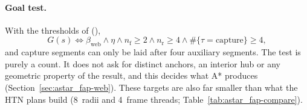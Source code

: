 \paragraph{Goal test.}
With the thresholds of  (),
\begin{equation}
  G(s) \iff \beta_{\mathrm{web}} \wedge \eta \wedge n_{\mathrm{f}}\ge 2 \wedge n_{\mathrm{r}}\ge 4
  \wedge \#\{\tau=\text{capture}\}\ge 4 ,
  \label{eq:astar_fap-goal}
\end{equation}
and capture segments can only be laid after four auxiliary segments. The test is purely a count.
It does not ask for distinct anchors, an interior hub or any geometric property of the result,
and this decides what A* produces (Section~\ref{sec:astar_fap-web}). These targets are also far
smaller than what the HTN plans build (8~radii and 4~frame threads; Table~\ref{tab:astar_fap-compare}).

